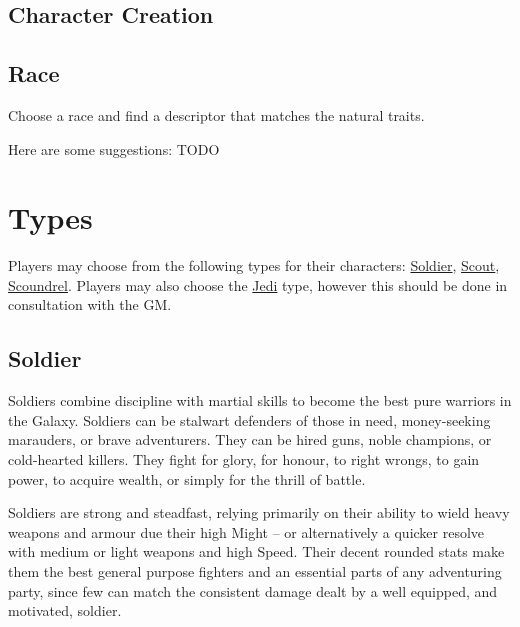 \documentclass[a4paper,10pt,final,twocolumn,oneside]{book}
\begin{document}
\subsection{Character Creation} %
\label{sub:character_creation}


\subsection{Race} %
\label{sub:race}

Choose a race and find a descriptor that matches the natural traits.

Here are some suggestions: TODO


\clearpage

\section{Types} %
\label{sec:types}

Players may choose from the following types for their characters: \hyperref[sub:soldier]{Soldier}, \hyperref[sub:scout]{Scout}, \hyperref[sub:scoundrel]{Scoundrel}. Players may also choose the \hyperref[sub:jedi]{Jedi} type, however this should be done in consultation with the GM.

\subsection{Soldier} %
\label{sub:soldier}

Soldiers combine discipline with martial skills to become the best pure warriors in the Galaxy. Soldiers can be stalwart defenders of those in need, money-seeking marauders, or brave adventurers. They can be hired guns, noble champions, or cold-hearted killers. They fight for glory, for honour, to right wrongs, to gain power, to acquire wealth,  or simply for the thrill of battle.

Soldiers are strong and steadfast, relying primarily on their ability to wield heavy weapons and armour due their high Might -- or alternatively a quicker resolve with medium or light weapons and high Speed. Their decent rounded stats make them the best general purpose fighters and an essential parts of any adventuring party, since few can match the consistent damage dealt by a well equipped, and motivated, soldier.
\end{document}

